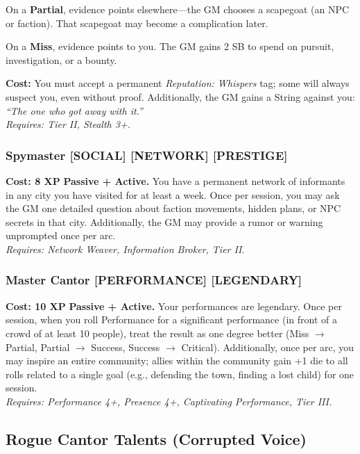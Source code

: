 On a \textbf{Partial}, evidence points elsewhere---the GM chooses a scapegoat (an NPC or faction). That scapegoat may become a complication later.

On a \textbf{Miss}, evidence points to you. The GM gains 2 SB to spend on pursuit, investigation, or a bounty.

\textbf{Cost:} You must accept a permanent \textit{Reputation: Whispers} tag; some will always suspect you, even without proof. Additionally, the GM gains a String against you: \textit{``The one who got away with it.''} \\
\textit{Requires: Tier II, Stealth 3+.}

\subsubsection*{Spymaster \textnormal{[SOCIAL] [NETWORK] [PRESTIGE]}}
\label{talent:spymaster}
\textbf{Cost: 8 XP} \textbf{Passive + Active.} You have a permanent network of informants in any city you have visited for at least a week. Once per session, you may ask the GM one detailed question about faction movements, hidden plans, or NPC secrets in that city. Additionally, the GM may provide a rumor or warning unprompted once per arc. \\
\textit{Requires: Network Weaver, Information Broker, Tier II.}

\subsubsection*{Master Cantor \textnormal{[PERFORMANCE] [LEGENDARY]}}
\label{talent:master-cantor}
\textbf{Cost: 10 XP} \textbf{Passive + Active.} Your performances are legendary. Once per session, when you roll Performance for a significant performance (in front of a crowd of at least 10 people), treat the result as one degree better (Miss $\rightarrow$ Partial, Partial $\rightarrow$ Success, Success $\rightarrow$ Critical). Additionally, once per arc, you may inspire an entire community; allies within the community gain +1 die to all rolls related to a single goal (e.g., defending the town, finding a lost child) for one session. \\
\textit{Requires: Performance 4+, Presence 4+, Captivating Performance, Tier III.}

\subsection*{Rogue Cantor Talents (Corrupted Voice)}
\label{sec:prestige-rogue-cantor}

